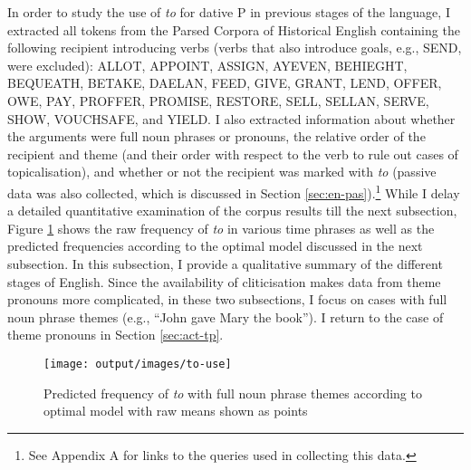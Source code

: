 	In order to study the use of \textit{to} for dative P in previous stages of the language, I extracted all tokens from the Parsed Corpora of Historical English \citep{Kroch.2000,Taylor.2003,Kroch.2004,Taylor.2006,Kroch.2010} containing the following recipient introducing verbs (verbs that also introduce goals, e.g., SEND, were excluded): ALLOT, APPOINT, ASSIGN, AYEVEN, BEHIEGHT, BEQUEATH, BETAKE, DAELAN, FEED, GIVE, GRANT, LEND, OFFER, OWE, PAY, PROFFER, PROMISE, RESTORE, SELL, SELLAN, SERVE, SHOW, VOUCHSAFE, and YIELD. I also extracted information about whether the arguments were full noun phrases or pronouns, the relative order of the recipient and theme (and their order with respect to the verb to rule out cases of topicalisation), and whether or not the recipient was marked with \textit{to} (passive data was also collected, which is discussed in Section \ref{sec:en-pas}).\footnote{See Appendix A for links to the queries used in collecting this data.} While I delay a detailed quantitative examination of the corpus results till the next subsection, Figure \ref{fig:to-use} shows the raw frequency of \textit{to} in various time phrases as well as the predicted frequencies according to the optimal model discussed in the next subsection. In this subsection, I provide a qualitative summary of the different stages of English. Since the availability of cliticisation makes data from theme pronouns more complicated, in these two subsections, I focus on cases with full noun phrase themes (e.g., ``John gave Mary the book''). I return to the case of theme pronouns in Section \ref{sec:act-tp}.

	\begin{figure}[ht!]
		\texttt{[image: output/images/to-use]}
		\caption{Predicted frequency of \textit{to} with full noun phrase themes according to optimal model with raw means shown as points}
		\label{fig:to-use}
	\end{figure}

